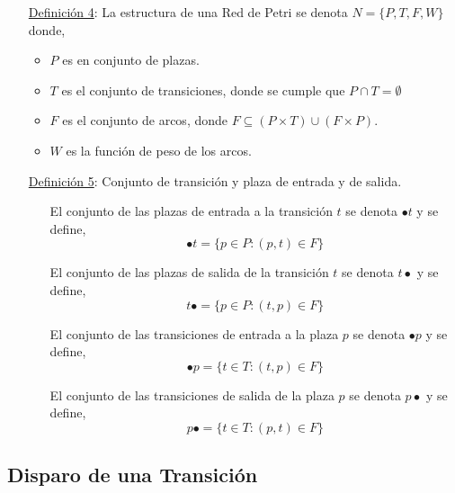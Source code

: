 \begin{itemize}
  En la figura \ref{fig:transiciones_no_sensibilizadas} se observa gráficamente esta definición mediante dos casos de transiciones no sensibilizadas. Nótese
  el peso de los arcos.

  \begin{figure}[h]
    \centering
    \texttt{[image: Transiciones\_No\_Sensibilizadas]}
    \caption{Ejemplos de transiciones no sensibilizadas.}
    \label{fig:transiciones_no_sensibilizadas}
  \end{figure}
  
  \item [\underline{Definición 4}:] La estructura de una Red de Petri
  se denota $ N = \{P, T, F, W\} $ donde,
  \begin{itemize}
    \item $P$ es en conjunto de plazas.
    \item $T$ es el conjunto de transiciones, donde se cumple que $ P \cap T =
    \emptyset $
    \item $F$ es el conjunto de arcos, donde $ F \subseteq (P
    \times T) \cup (F \times P) $.
    \item $W$ es la función de peso de los arcos.
  \end{itemize}

  \item [\underline{Definición 5}:] Conjunto de transición y plaza de entrada y
  de salida.
  \begin{itemize}
    \item[] El conjunto de las plazas de entrada a la transición $t$ se denota
    $\bullet t$ y se define,
    $$ \bullet t = \{ p \in P : (p, t) \in F \} $$
    \item[] El conjunto de las plazas de salida de la transición $t$ se denota $
    t \bullet$ y se define,
    $$ t \bullet = \{ p \in P : (t, p) \in F \} $$
    \item[] El conjunto de las transiciones de entrada a la plaza $p$ se
    denota $\bullet p$ y se define,
    $$ \bullet p = \{ t \in T : (t, p) \in F \} $$
    \item[] El conjunto de las transiciones de salida de la plaza $p$ se denota
    $ p \bullet$ y se define,
    $$ p \bullet = \{ t \in T : (p, t) \in F \} $$
  \end{itemize}
\end{itemize}

\subsection{Disparo de una Transición}

